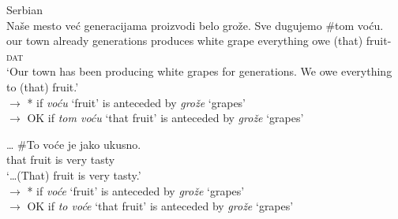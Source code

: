 \documentclass[output=paper,
modfonts
]{langscibook}
\begin{document}
	
	\ea \label{ex:despic:13}
	Serbian \\
	\ea \label{ex:despic:13a}
	\gll
	{Na\v se} {mesto} {ve\'c} {generacijama} {proizvodi} {belo} {gro\v z\dj e}. {Sve} {dugujemo} {\textnormal{\#}{\op}tom{\cp}} {vo\'cu}. \\
	our town already generations produces white grape everything owe \phantom{\#}(that) fruit-\textsc{dat} \\ 
	\glt `Our town has been producing white grapes for generations. We owe everything to (that) fruit.' \\ 
	$\rightarrow$ * if \textit{vo\'cu} `fruit' is anteceded by \textit{gro\v z\dj e} `grapes' \\
	$\rightarrow$ OK if \textit{tom vo\'cu} `that fruit' is anteceded by \textit{gro\v z\dj e} `grapes'
	
	\ex \label{ex:despic:13b}
	\gll 
	{\ldots} {\textnormal{\#}{\op}To{\cp}} {vo\'ce} {je} {jako} {ukusno}.  \\
	{} \phantom{\#{\op}}that fruit is very tasty \\
	\glt `\ldots (That) fruit is very tasty.' \\
	$\rightarrow$ * if \textit{vo\'ce} `fruit' is anteceded by \textit{gro\v z\dj e} `grapes' \\
	$\rightarrow$ OK if \textit{to vo\'ce} `that fruit' is anteceded by \textit{gro\v z\dj e} `grapes' 
	\z
	\z 
	
\end{document}
